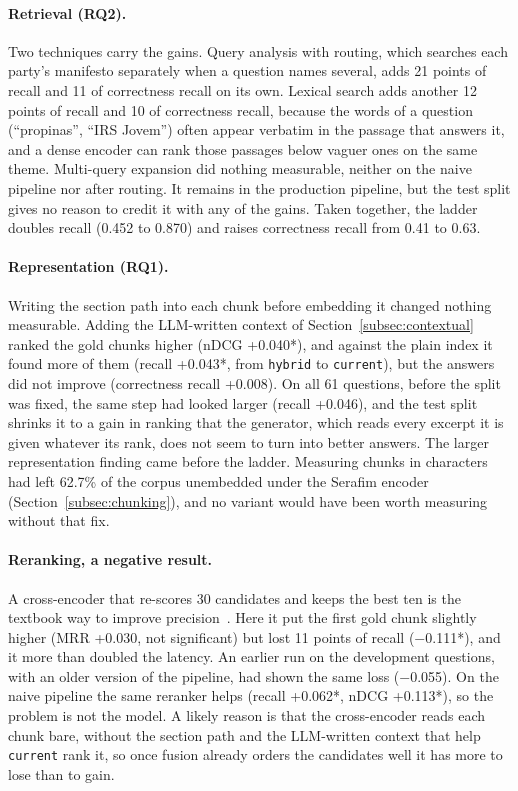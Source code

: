 \paragraph{Retrieval (RQ2).} Two techniques carry the gains. Query analysis
with routing, which searches each party's manifesto separately when a
question names several, adds 21 points of recall and 11 of correctness
recall on its own. Lexical search adds another 12 points of recall and 10 of
correctness recall, because the words of a question (``propinas'', ``IRS
Jovem'') often appear verbatim in the passage that answers it, and a dense
encoder can rank those passages below vaguer ones on the same theme. Multi-query
expansion did nothing measurable, neither on the naive pipeline nor after
routing. It remains in the production pipeline, but the test split gives no
reason to credit it with any of the gains. Taken
together, the ladder doubles recall (0.452 to 0.870) and raises correctness
recall from 0.41 to 0.63.

\paragraph{Representation (RQ1).} Writing the section path into each chunk
before embedding it changed nothing measurable. Adding the LLM-written context
of Section~\ref{subsec:contextual} ranked the gold chunks higher (nDCG
+0.040*), and against the plain index it found more of them (recall +0.043*,
from \texttt{hybrid} to \texttt{current}), but the answers did not improve
(correctness recall +0.008). On all 61 questions, before the split was
fixed, the same step had looked larger (recall +0.046), and the test split
shrinks it to a gain in
ranking that the generator, which reads every excerpt it is given whatever
its rank, does not seem to turn into better answers. The larger representation finding came before the
ladder. Measuring chunks in characters had left 62.7\% of the corpus
unembedded under the Serafim encoder (Section~\ref{subsec:chunking}), and no
variant would have been worth measuring without that fix.

\paragraph{Reranking, a negative result.} A cross-encoder that re-scores 30
candidates and keeps the best ten is the textbook way to improve
precision~\citep{nogueira2019passagererankingbert}. Here it put the first gold chunk
slightly higher (MRR +0.030, not significant) but lost 11 points of recall
($-$0.111*), and it more than doubled the latency. An earlier run on the development
questions, with an older version of the pipeline, had shown the same loss
($-$0.055). On the naive pipeline the same reranker helps
(recall +0.062*, nDCG +0.113*), so the problem is not the model. A likely reason is
that the cross-encoder reads each chunk bare, without the section path and
the LLM-written context that help \texttt{current} rank it, so once fusion
already orders the candidates well it has more to lose than to gain.

